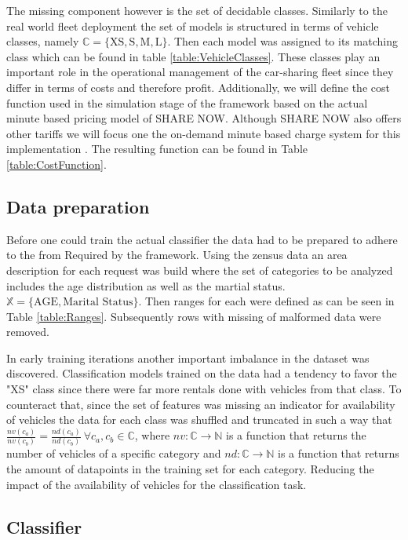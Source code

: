 The missing component however is the set of decidable classes. Similarly to the real world fleet deployment the
set of models is structured in terms of vehicle classes, namely $\mathbb{C} = \{ \text{XS}, \text{S}, \text{M}, \text{L} \}$.
Then each model was assigned to its matching class which can be found in table \ref{table:VehicleClasses}.
These classes play an important role in the operational management of the car-sharing fleet since they differ in terms of costs and therefore profit.
 Additionally, we will define the cost function used in the simulation stage
of the framework based on the actual minute based pricing model of SHARE NOW. Although SHARE NOW also offers other tariffs we will focus one
the on-demand minute based charge system for this implementation \cite{ShareNowPricing}. The resulting function can be found in Table \ref{table:CostFunction}.

\subsection{Data preparation}
\label{sub_sec:CaseStudy/Preparation}

Before one could train the actual classifier the data had to be prepared to adhere to the from
Required by the framework. Using the zensus data an area description for each request was
build where the set of categories to be analyzed includes the age distribution as well as the martial status.
$\mathbb{X} = \{ \text{AGE}, \text{Marital Status} \}$. Then ranges for each were defined as can be seen in Table \ref{table:Ranges}.
Subsequently rows with missing of malformed data were removed.

In early training iterations another important imbalance in the dataset was discovered. Classification models
trained on the data had a tendency to favor the "XS" class since there were far more rentals done with
vehicles from that class. To counteract that, since the set of features was missing an indicator for availability
of vehicles the data for each class was shuffled and truncated in such a way that
$\frac{nv(c_a)}{nv(c_b)} = \frac{nd(c_a)}{nd(c_b)} \ \forall c_a, c_b \in \mathbb{C}$, where $nv: \mathbb{C} \to \mathbb{N}$ is a function
that returns the number of vehicles of a specific category and $nd: \mathbb{C} \to \mathbb{N}$ is a function that returns the
amount of datapoints in the training set for each category. Reducing the impact of the availability of vehicles for
the classification task.

\subsection{Classifier}
\label{sub_sec:CaseStudy/Classifier}

